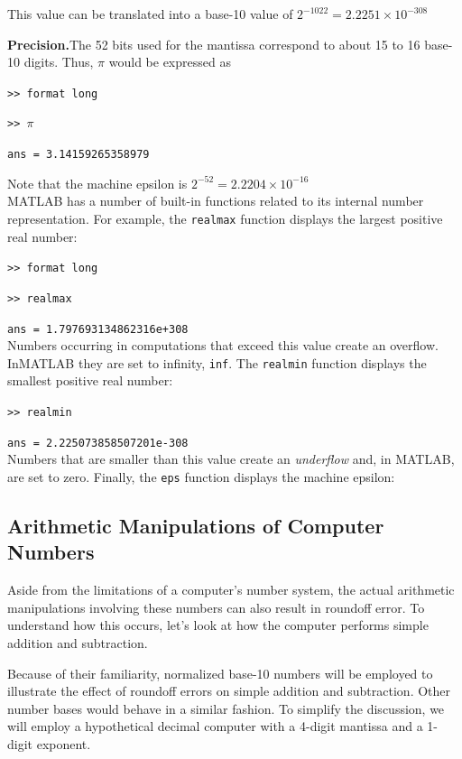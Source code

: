 \documentclass[../main.tex]{subfiles}
\begin{document}
\noindent
This value can be translated into a base-10 value of $2^{-1022}=2.2251\times10^{-308}$

\noindent
\textbf{Precision.}\quad The 52 bits used for the mantissa correspond to about 15 to 16 base-10 digits.
Thus, $\pi$ would be expressed as

\texttt{>> format long}

\texttt{>> $\pi$}

\texttt{ans = 3.14159265358979}
\newpage

\noindent
Note that the machine epsilon is $2^{-52}=2.2204\times 10^{-16}$\\

MATLAB has a number of built-in functions related to its internal number representation.
For example, the \texttt{realmax} function displays the largest positive real number:

\texttt{>> format long}

\texttt{>> realmax}

\texttt{ans = 1.797693134862316e+308}\\

Numbers occurring in computations that exceed this value create an overflow. InMATLAB
they are set to infinity, \texttt{inf}. The \texttt{realmin} function displays the smallest positive real
number:

\texttt{>> realmin}

\texttt{ans = 2.225073858507201e-308}\\

\noindent
Numbers that are smaller than this value create an \emph{underflow} and, in MATLAB, are set to
zero. Finally, the \texttt{eps} function displays the machine epsilon:\\

\subsection{Arithmetic Manipulations of Computer Numbers}

\noindent
Aside from the limitations of a computer's number system, the actual arithmetic manipulations
involving these numbers can also result in roundoff error. To understand how this
occurs, let's look at how the computer performs simple addition and subtraction.

Because of their familiarity, normalized base-10 numbers will be employed to illustrate
the effect of roundoff errors on simple addition and subtraction. Other number bases
would behave in a similar fashion. To simplify the discussion, we will employ a hypothetical
decimal computer with a 4-digit mantissa and a 1-digit exponent.
\end{document}
